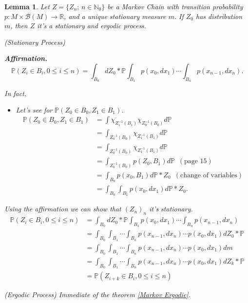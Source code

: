 \documentclass[a4paper]{article}
\theoremstyle{plain}
\newtheorem{lemma}[theorem]{Lemma}
\theoremstyle{definition}
\begin{document}
    \begin{lemma} Let $Z = \{Z_{n};\, n \in \mathbb{N}_0\}$ be a Markov Chain with transition probability $p: M \times \mathcal{B}(M) \to \mathbb R$, and a unique stationary measure $m$. If $Z_0$ has distribution $m$, then $Z$ it's a stationary and ergodic process.

    \proof
    (Stationary Process) 
    
    \textbf{Affirmation.} 
    $$ \mathbb{P}(Z_i \in B_i, 0 \leq i \leq n ) = \int_{B_0} d Z_0 * \mathbb P \int_{B_1} p(x_0,dx_1) \cdots \int_{B_n} p(x_{n-1},dx_n).$$

    In fact, 
    \begin{itemize}
        \item Let's see for $\mathbb{P}(Z_0 \in B_0, Z_1 \in B_1) $.
        \begin{align*}
        \mathbb{P}(Z_0 \in B_0, Z_1 \in B_1) 
       & = \int \chi_{Z_1^{-1}(B_1)} \chi_{Z_0^{-1}(B_0)} d\mathbb P\\    
       & = \int_{Z_0^{-1}(B_0)} \chi_{Z_1^{-1}(B_1)}  d\mathbb P  \\
       & = \int_{Z_0^{-1}(B_0)} \chi_{Z_1^{-1}(B_1)}  d\mathbb P \\
       & = \int_{Z_0^{-1}(B_0)} p(Z_0,B_1)  d\mathbb P \,\,\,(\text{page 15})\\
       & = \int_{B_0} p(x_0,B_1)  d\mathbb P * Z_0 \,\,\,(\text{change of variables})\\
       & = \int_{B_0} \int_{B_1} p(x_0,dx_1)  d\mathbb P * Z_0.
        \end{align*}
    \end{itemize}

    Using the affirmation we can show that $(Z_n)_n$ it's stationary. 
    \begin{align*}
\mathbb{P}(Z_i \in B_i, 0 \leq i \leq n ) 
&= \int_{B_0} d Z_0 * \mathbb P \int_{B_1} p(x_0,dx_1) \cdots \int_{B_n} p(x_{n-1},dx_n) \\
&= \int_{B_0}  \int_{B_1} \cdots \int_{B_n} p(x_{n-1},dx_n) \cdots
p(x_0,dx_1) d Z_0 * \mathbb P \\
&= \int_{B_0}  \int_{B_1} \cdots \int_{B_n} p(x_{n-1},dx_n) \cdots
p(x_0,dx_1) d m \\
&= \int_{B_0}  \int_{B_1} \cdots \int_{B_n} p(x_{n-1},dx_n) \cdots
p(x_0,dx_1) d Z_k * \mathbb P \\
&= \mathbb{P}(Z_{i+k} \in B_i, 0 \leq i \leq n ) 
    \end{align*}

    (Ergodic Process) Immediate of the theorem \ref{Markov Ergodic}.
    \end{lemma}
    
\end{document}
